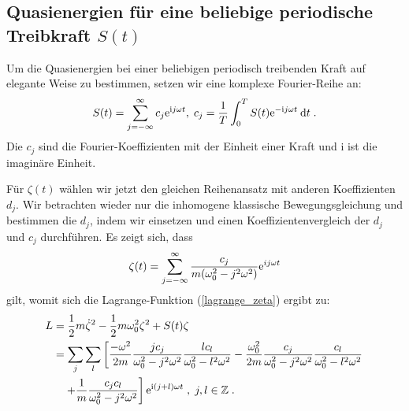     \subsection{Quasienergien für eine beliebige periodische Treibkraft $S(t)$}
      \label{epsilon_bel_kraft}
      Um die Quasienergien bei einer beliebigen periodisch treibenden Kraft auf elegante Weise zu bestimmen,
      setzen wir eine komplexe Fourier-Reihe an:
      \begin{equation}
        S(t) = \sum_{j=-\infty}^\infty c_j \text e^{\text ij\omega t}, \; c_j = \frac{1}{T} \int_0^T S(t) \text e^{-\text ij\omega t} \: \text d t \; .
      \end{equation}
      Die $c_j$ sind die Fourier-Koeffizienten mit der Einheit einer Kraft und i ist die imaginäre Einheit.
\iffalse
      Für $\zeta(t)$ wählen wir jetzt ebenfalls einen Reihenansatz:
      \begin{equation}
        \zeta(t) = \sum_{j=-\infty}^\infty d_j \text e^{\text ij\omega t} \; .
      \end{equation}
\fi
      Für $\zeta(t)$ wählen wir jetzt den gleichen Reihenansatz mit anderen Koeffizienten $d_j$.
      Wir betrachten wieder nur die inhomogene klassische Bewegungsgleichung und bestimmen die $d_j$, indem wir einsetzen und einen Koeffizientenvergleich der $d_j$ und $c_j$ durchführen.
      Es zeigt sich, dass
      \begin{equation}
        \zeta(t) = \sum_{j=-\infty}^\infty \frac{c_j}{m(\omega_0^2-j^2\omega^2)} \text e^{ij\omega t}
        \label{zeta_bel_kraft}
      \end{equation}
      gilt, womit sich die Lagrange-Funktion (\ref{lagrange_zeta}) ergibt zu:
      \begin{align}
        \begin{split}
          L &= \frac{1}{2}m\dot \zeta^2 - \frac{1}{2}m\omega_0^2\zeta^2 + S(t)\zeta \notag\\
           &=\sum_j \sum_l \left[ \frac{-\omega^2}{2m} \frac{jc_j}{\omega_0^2-j^2\omega^2} \frac{lc_l}{\omega_0^2-l^2\omega^2}
           -\frac{\omega_0^2}{2m} \frac{c_j}{\omega_0^2-j^2\omega^2} \frac{c_l}{\omega_0^2-l^2\omega^2} \right. \notag\\
            &\left. \quad + \frac{1}{m} \frac{c_jc_l}{\omega_0^2-j^2\omega^2} \right] \text e^{\text i(j+l)\omega t}  \; , \; j,l \in \mathbb{Z} \; .
         \end{split}
       \end{align}
